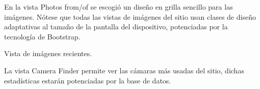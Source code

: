 \documentclass{memoria}
\begin{document}
\newpage

En la vista Photos from/of se escogió un diseño en grilla sencillo para las imágenes. Nótese que todas las vistas de imágenes del sitio usan clases de diseño adaptativas al tamaño de la pantalla del dispositivo, potenciadas por la tecnología de Bootstrap.

Vista de imágenes recientes.

\newpage

La vista Camera Finder permite ver las cámaras más usadas del sitio, dichas estadísticas estarán potenciadas por la base de datos.
\end{document}
